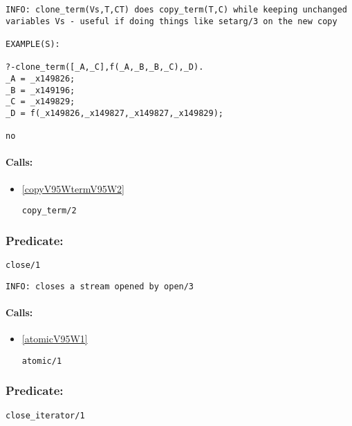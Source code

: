 {\small \begin{verbatim}
INFO: clone_term(Vs,T,CT) does copy_term(T,C) while keeping unchanged variables Vs - useful if doing things like setarg/3 on the new copy

EXAMPLE(S):

?-clone_term([_A,_C],f(_A,_B,_B,_C),_D).
_A = _x149826;
_B = _x149196;
_C = _x149829;
_D = f(_x149826,_x149827,_x149827,_x149829);

no

\end{verbatim}}
\paragraph{Calls:} 
\begin{itemize}
\item \ref{copyV95WtermV95W2} 
\begin{verbatim}
copy_term/2
\end{verbatim}

\end{itemize}

\subsubsection{Predicate:} \label{closeV95W1}

\begin{verbatim}
close/1
\end{verbatim}

{\small \begin{verbatim}
INFO: closes a stream opened by open/3

\end{verbatim}}
\paragraph{Calls:} 
\begin{itemize}
\item \ref{atomicV95W1} 
\begin{verbatim}
atomic/1
\end{verbatim}

\end{itemize}

\subsubsection{Predicate:} \label{closeV95WiteratorV95W1}

\begin{verbatim}
close_iterator/1
\end{verbatim}

